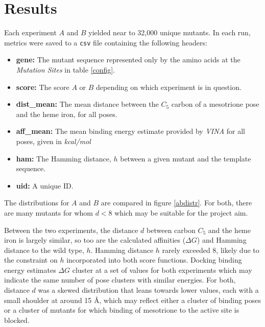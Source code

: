 \documentclass[16pt]{article}
\begin{document}
\section{Results}

Each experiment $A$ and $B$ yielded near to 32,000 unique mutants.
In each run, metrics were saved to a \texttt{csv} file containing the following headers:

\begin{itemize}
	\item \textbf{gene:} The mutant sequence represented only by the amino acids at the \textit{Mutation Sites} in table \ref{config}.
	\item \textbf{score:} The score $A$ or $B$ depending on which experiment is in question.
	\item \textbf{dist\_mean:} The mean distance between the $C_5$ carbon of a mesotrione pose and the heme iron, for all poses.
	\item \textbf{aff\_mean:} The mean binding energy estimate provided by \textit{VINA} for all poses, given in \textit{kcal/mol}
	\item \textbf{ham:} The Hamming distance, $h$ between a given mutant and the template sequence.
	\item \textbf{uid:} A unique ID.
\end{itemize}

The distributions for $A$ and $B$ are compared in figure \ref{abdistr}.
For both, there are many mutants for whom $d < 8$ which may be suitable for the project aim.

Between the two experiments, the distance $d$ between carbon $C_5$ and the heme iron is largely similar, so too are the calculated affinities ($\Delta G$) and Hamming distance to the wild type, $h$.
Hamming distance $h$ rarely exceeded 8, likely due to the constraint on $h$ incorporated into both score functions.
Docking binding energy estimates $\Delta G$ cluster at a set of values for both experiments which may indicate the same number of pose clusters with similar energies. 
For both, distance $d$ was a skewed distribution that leans towards lower values, each with a small shoulder at around 15 \AA, which may reflect either a cluster of binding poses or a cluster of mutants for which binding of mesotrione to the active site is blocked.
\end{document}
